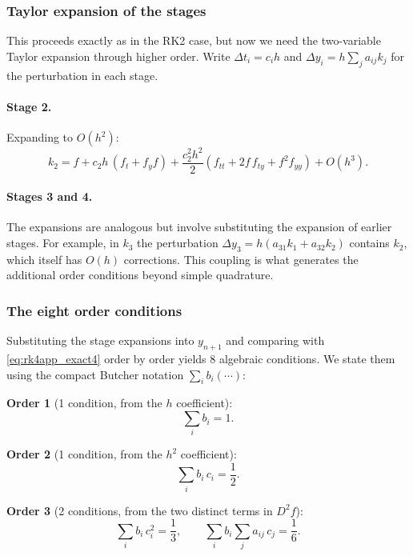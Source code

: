 \documentclass[12pt,a4paper]{article}
\theoremstyle{definition}
\theoremstyle{plain}
\theoremstyle{remark}
\begin{document}
\subsubsection{Taylor expansion of the stages}

This proceeds exactly as in the RK2 case, but now we need the two-variable Taylor expansion through higher order. Write $\Delta t_i = c_i h$ and $\Delta y_i = h \sum_j a_{ij} k_j$ for the perturbation in each stage.

\paragraph{Stage 2.} Expanding to $O(h^2)$:
\begin{equation}
  k_2 = f + c_2 h\,(f_t + f_y f) + \frac{c_2^2 h^2}{2}(f_{tt} + 2f\,f_{ty} + f^2 f_{yy}) + O(h^3).
\end{equation}

\paragraph{Stages 3 and 4.} The expansions are analogous but involve substituting the expansion of earlier stages. For example, in $k_3$ the perturbation $\Delta y_3 = h(a_{31}k_1 + a_{32}k_2)$ contains $k_2$, which itself has $O(h)$ corrections. This coupling is what generates the additional order conditions beyond simple quadrature.

\subsubsection{The eight order conditions}

Substituting the stage expansions into $y_{n+1}$ and comparing with \eqref{eq:rk4app_exact4} order by order yields 8 algebraic conditions. We state them using the compact Butcher notation $\sum_i b_i (\cdots)$:

\medskip

\noindent\textbf{Order 1} (1 condition, from the $h$ coefficient):
\begin{equation}\label{eq:rk4app_oc1}
  \sum_i b_i = 1.
\end{equation}

\noindent\textbf{Order 2} (1 condition, from the $h^2$ coefficient):
\begin{equation}\label{eq:rk4app_oc2}
  \sum_i b_i\, c_i = \frac{1}{2}.
\end{equation}

\noindent\textbf{Order 3} (2 conditions, from the two distinct terms in $D^2f$):
\begin{equation}\label{eq:rk4app_oc3}
  \sum_i b_i\, c_i^2 = \frac{1}{3}, \qquad \sum_i b_i \sum_j a_{ij}\, c_j = \frac{1}{6}.
\end{equation}
\end{document}
